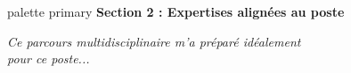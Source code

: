 \documentclass[aspectratio=169,11pt]{beamer}
\begin{document}
\begin{frame}{}
  \begin{beamercolorbox}[wd=\paperwidth,ht=1.8cm,dp=0.3cm,center]{palette primary}
    {\large\bfseries Section 2 : Expertises alignées au poste}
  \end{beamercolorbox}
  
  \vspace{1.5cm}
  
  \centering
  {\Large\textit{Ce parcours multidisciplinaire m'a préparé idéalement\\pour ce poste...}}
  
  \vspace{1em}
  
  {\large{}}
  \vfill
\end{frame}
\end{document}
